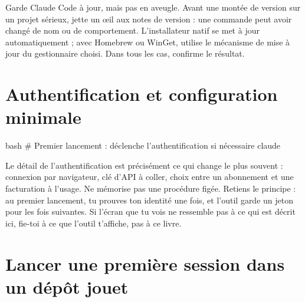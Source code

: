 \begin{astuce}
Garde Claude Code à jour, mais pas en aveugle. Avant une montée de version sur
un projet sérieux, jette un œil aux notes de version : une commande peut avoir
changé de nom ou de comportement. L'installateur natif se met à jour
automatiquement ; avec Homebrew ou WinGet, utilise le mécanisme de mise à jour
du gestionnaire choisi. Dans tous les cas,  confirme le
résultat.
\end{astuce}

\section{Authentification et configuration minimale}


\begin{extraitcode}{bash}
# Premier lancement : déclenche l'authentification si nécessaire
claude
\end{extraitcode}


\begin{avertissement}
Le détail de l'authentification est précisément ce qui change le plus souvent :
connexion par navigateur, clé d'API à coller, choix entre un abonnement et une
facturation à l'usage. Ne mémorise pas une procédure figée. Retiens le principe :
au premier lancement, tu prouves ton identité une fois, et l'outil garde un jeton
pour les fois suivantes. Si l'écran que tu vois ne ressemble pas à ce qui est
décrit ici, fie-toi à ce que l'outil t'affiche, pas à ce livre.
\end{avertissement}

\section{Lancer une première session dans un dépôt jouet}

